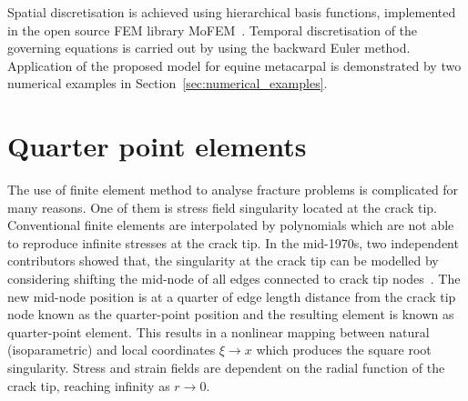 \documentclass[11pt]{acmeArticle}
\numberwithin{equation}{section}
\begin{document}
Spatial discretisation is achieved using
hierarchical basis functions, implemented in the open source FEM library
MoFEM~\citep{mofem2017}. Temporal discretisation of the governing equations
is carried out by using the backward Euler method. Application of the proposed
model for equine metacarpal is demonstrated by two numerical examples in
Section~\ref{sec:numerical_examples}.

\section{Quarter point elements}

The use of finite element method to analyse fracture problems is complicated for many reasons. One of them is stress field singularity located at the crack tip.
Conventional finite elements are interpolated by polynomials which are not able to reproduce infinite stresses at the crack tip. 
In the mid-1970s, two independent contributors showed that, the singularity at the crack tip can be modelled by considering shifting the mid-node of all edges connected to crack tip nodes~\citep{barsoum1976use,henshell1975crack}.
The new mid-node position is at a quarter of edge length distance from the crack tip node known as the quarter-point position and the resulting element is known as quarter-point element. 
This results in a nonlinear mapping between natural (isoparametric) and local coordinates $\xi \rightarrow x$ which produces  the square root singularity. Stress and strain fields are dependent on the radial function of the crack tip, reaching infinity as $ r \rightarrow 0$. \\


\end{document}
